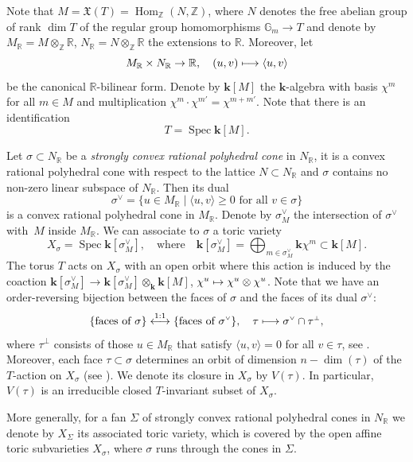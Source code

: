 \documentclass[JEP,XML,SOM,Unicode]{cedram}
\def\mto{\mathchoice{\longmapsto}{\mapsto}{\mapsto}{\mapsto}}
\let\oldvee\vee
\renewcommand{\vee}{{\scriptscriptstyle\oldvee}}
\let\oldbot\bot
\renewcommand{\bot}{{\scriptscriptstyle\oldbot}}
\theoremstyle{plain}
\theoremstyle{definition}
\DeclareMathOperator{\Spec}{Spec}
\DeclareMathOperator{\Hom}{Hom}
\newcommand{\GG}{\mathbb{G}}
\newcommand{\RR}{\mathbb{R}}
\newcommand{\ZZ}{\mathbb{Z}}
\newcommand{\kk}{{\boldsymbol{k}}}
\newcommand{\set}[2]{\{#1 \mid #2\}}
\newcommand{\sprod}[2]{\langle #1, #2 \rangle}
\begin{document}
Note that $M = \mathfrak{X}(T) = \Hom_\ZZ(N, \ZZ)$, where $N$ denotes the free abelian group of rank
$\dim T$ of the regular group homomorphisms $\GG_m \to T$
and denote by $M_{\RR} = M \otimes_{\ZZ} \RR$, $N_{\RR} = N \otimes_{\ZZ} \RR$ the extensions to $\RR$.
Moreover, let
\[
M_{\RR} \times N_{\RR} \to \RR, \quad
(u, v) \mto \langle u, v \rangle
\]
be the canonical $\RR$-bilinear form. Denote by $\kk[M]$ the $\kk$-algebra with basis $\chi^m$ for all $m \in M$
and multiplication $\chi^m \cdot \chi^{m'} = \chi^{m+m'}$. Note that there is an identification
\[
T = \Spec \kk[M].
\]

Let $\sigma \subset N_{\RR}$ be a \emph{strongly convex rational
polyhedral cone} in $N_{\RR}$, \ie it is a convex rational polyhedral cone with respect to the lattice $N \subset N_{\RR}$ and $\sigma$ contains no non-zero linear subspace of $N_\RR$. Then its dual
\[
\sigma^\vee = \set{u \in M_{\RR}}{\textrm{$\langle u, v \rangle \geq 0$ for all $v \in \sigma$}}
\]
is a convex rational polyhedral cone in $M_\RR$.
Denote by $\sigma_M^\vee$ the intersection of $\sigma^\vee$ with~$M$ inside $M_{\RR}$.
We can associate to $\sigma$ a toric variety
\[
X_\sigma = \Spec \kk[\sigma_M^\vee], \quad \textrm{where} \quad
\kk[\sigma_M^\vee] = \bigoplus_{m \in \sigma_M^\vee} \kk \chi^m \subset \kk[M].
\]
The torus $T$ acts on $X_{\sigma}$ with an open orbit where this action is induced by the
coaction
$\kk[\sigma_M^\vee] \to \kk[\sigma_M^\vee] \otimes_{\kk} \kk[M]$,
$\chi^u \mto \chi^u \otimes \chi^u$. Note that we have an order-reversing
bijection between the faces of $\sigma$ and the faces of its dual $\sigma^\vee$:
\[
\{\textrm{faces of $\sigma$}\} \stackrel{1:1}{\longleftrightarrow}
\{\textrm{faces of $\sigma^\vee$}\}, \quad
\tau \mto \sigma^\vee \cap \tau^{\bot},
\]
where $\tau^\bot$ consists of those $u \in M_\RR$ that satisfy $\sprod{u}{v} = 0$ for all $v \in \tau$,
see \cite[Propty\,(10), p.\,12]{Fu1993Introduction-to-to}. Moreover, each face $\tau \subset \sigma$
determines an orbit of dimension \hbox{$n - \dim(\tau)$} of the $T$-action on $X_\sigma$ (see \cite[\S3.1]{Fu1993Introduction-to-to}).
We denote its closure in $X_\sigma$ by $V(\tau)$. In particular, $V(\tau)$ is an irreducible closed
$T$-invariant subset of $X_{\sigma}$.

More generally, for a fan $\Sigma$ of strongly convex rational polyhedral
cones in $N_{\RR}$ we denote by $X_\Sigma$ its
associated toric variety, which is covered by the open affine toric subvarieties $X_{\sigma}$,
where $\sigma$ runs through the cones in $\Sigma$.
\end{document}
